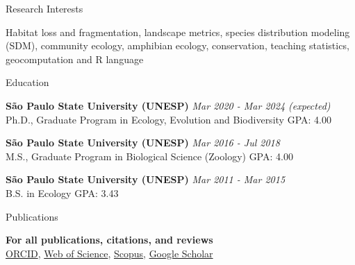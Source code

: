 \documentclass{resume}
\begin{document}

\begin{rSection}{Research Interests}

Habitat loss and fragmentation, landscape metrics, species distribution modeling (SDM), community ecology, amphibian ecology, conservation, teaching statistics, geocomputation and R language

\end{rSection}


\begin{rSection}{Education}

{\bf São Paulo State University (UNESP)} \hfill {\em Mar 2020 - Mar 2024 (expected)}
\\ Ph.D., Graduate Program in Ecology, Evolution and Biodiversity \hfill { GPA: 4.00 } 

{\bf São Paulo State University (UNESP)} \hfill {\em Mar 2016 - Jul 2018}
\\ M.S., Graduate Program in Biological Science (Zoology)\hfill { GPA: 4.00 }

{\bf São Paulo State University (UNESP)} \hfill {\em Mar 2011 - Mar 2015}
\\ B.S. in Ecology\hfill { GPA: 3.43 } \\ 

\end{rSection}


\begin{rSection}{Publications}

{\bf For all publications, citations, and reviews}
\\ \href{https://orcid.org/0000-0001-9650-7575}{ORCID}, \href{https://www.webofscience.com/wos/author/record/837504}{Web of Science}, \href{https://www.scopus.com/authid/detail.uri?authorId=57193451888}{Scopus}, \href{https://scholar.google.com/citations?user=i-2xZBQAAAAJ}{Google Scholar}

\end{rSection}
\end{document}

